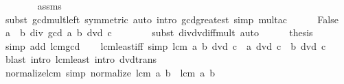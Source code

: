 \begin{isabellebody}
\ \ \ \ \ \ \isamarkupfalse%
\ assms\ \isamarkupfalse%
\ {\isacharparenleft}{\kern0pt}subst\ gcd{\isacharunderscore}{\kern0pt}mult{\isacharunderscore}{\kern0pt}left\ {\isacharbrackleft}{\kern0pt}symmetric{\isacharbrackright}{\kern0pt}{\isacharparenright}{\kern0pt}\ {\isacharparenleft}{\kern0pt}auto\ intro{\isacharbang}{\kern0pt}{\isacharcolon}{\kern0pt}\ gcd{\isacharunderscore}{\kern0pt}greatest\ simp{\isacharcolon}{\kern0pt}\ mult{\isacharunderscore}{\kern0pt}ac{\isacharparenright}{\kern0pt}\isanewline
\ \ \ \ \isamarkupfalse%
\ False\ \isamarkupfalse%
\ {\isachardoublequoteopen}{\isacharparenleft}{\kern0pt}a\ {\isacharasterisk}{\kern0pt}\ b\ div\ gcd\ a\ b{\isacharparenright}{\kern0pt}\ dvd\ c{\isachardoublequoteclose}\isanewline
\ \ \ \ \ \ \isamarkupfalse%
\ {\isacharparenleft}{\kern0pt}subst\ div{\isacharunderscore}{\kern0pt}dvd{\isacharunderscore}{\kern0pt}iff{\isacharunderscore}{\kern0pt}mult{\isacharparenright}{\kern0pt}\ auto\isanewline
\ \ \ \ \isamarkupfalse%
\ {\isacharquery}{\kern0pt}thesis\ \isamarkupfalse%
\ {\isacharparenleft}{\kern0pt}simp\ add{\isacharcolon}{\kern0pt}\ lcm{\isacharunderscore}{\kern0pt}gcd{\isacharparenright}{\kern0pt}\isanewline
\ \ \isamarkupfalse%
\isanewline
{}\isamarkupfalse%
%
\endisatagproof
{\isafoldproof}%
%
\isadelimproof
\isanewline
%
\endisadelimproof
\isanewline
{}\isamarkupfalse%
\ lcm{\isacharunderscore}{\kern0pt}least{\isacharunderscore}{\kern0pt}iff\ {\isacharbrackleft}{\kern0pt}simp{\isacharbrackright}{\kern0pt}{\isacharcolon}{\kern0pt}\ {\isachardoublequoteopen}lcm\ a\ b\ dvd\ c\ {\isasymlongleftrightarrow}\ a\ dvd\ c\ {\isasymand}\ b\ dvd\ c{\isachardoublequoteclose}\isanewline
%
\isadelimproof
\ \ %
\endisadelimproof
%
\isatagproof
{}\isamarkupfalse%
\ {\isacharparenleft}{\kern0pt}blast\ intro{\isacharbang}{\kern0pt}{\isacharcolon}{\kern0pt}\ lcm{\isacharunderscore}{\kern0pt}least\ intro{\isacharcolon}{\kern0pt}\ dvd{\isacharunderscore}{\kern0pt}trans{\isacharparenright}{\kern0pt}%
\endisatagproof
{\isafoldproof}%
%
\isadelimproof
\isanewline
%
\endisadelimproof
\isanewline
{}\isamarkupfalse%
\ normalize{\isacharunderscore}{\kern0pt}lcm\ {\isacharbrackleft}{\kern0pt}simp{\isacharbrackright}{\kern0pt}{\isacharcolon}{\kern0pt}\ {\isachardoublequoteopen}normalize\ {\isacharparenleft}{\kern0pt}lcm\ a\ b{\isacharparenright}{\kern0pt}\ {\isacharequal}{\kern0pt}\ lcm\ a\ b{\isachardoublequoteclose}\isanewline
%
\isadelimproof

\end{isabellebody}
